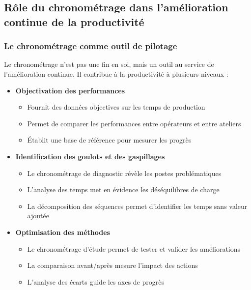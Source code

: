\documentclass[a4paper,12pt]{article}
\begin{document}
\subsection*{Rôle du chronométrage dans l'amélioration continue de la productivité}

\subsubsection*{Le chronométrage comme outil de pilotage}

Le chronométrage n'est pas une fin en soi, mais un outil au service de l'amélioration continue. Il contribue à la productivité à plusieurs niveaux :

\begin{itemize}
    \item \textbf{Objectivation des performances}
    \begin{itemize}
        \item Fournit des données objectives sur les temps de production
        \item Permet de comparer les performances entre opérateurs et entre ateliers
        \item Établit une base de référence pour mesurer les progrès
    \end{itemize}
    
    \item \textbf{Identification des goulots et des gaspillages}
    \begin{itemize}
        \item Le chronométrage de diagnostic révèle les postes problématiques
        \item L'analyse des temps met en évidence les déséquilibres de charge
        \item La décomposition des séquences permet d'identifier les temps sans valeur ajoutée
    \end{itemize}
    
    \item \textbf{Optimisation des méthodes}
    \begin{itemize}
        \item Le chronométrage d'étude permet de tester et valider les améliorations
        \item La comparaison avant/après mesure l'impact des actions
        \item L'analyse des écarts guide les axes de progrès
    \end{itemize}
\end{itemize}
\end{document}
